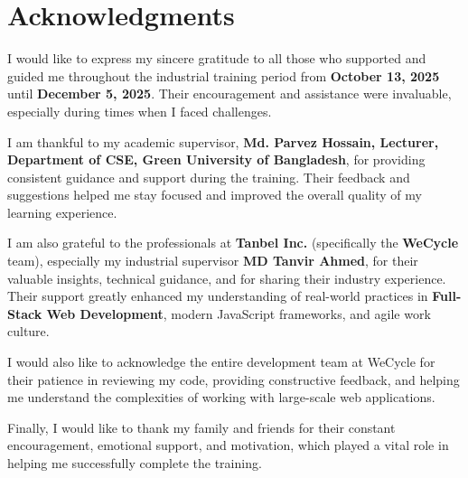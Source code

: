 \chapter*{\centering Acknowledgments}

I would like to express my sincere gratitude to all those who supported and guided me throughout the industrial training period from \textbf{October 13, 2025} until \textbf{December 5, 2025}. Their encouragement and assistance were invaluable, especially during times when I faced challenges.

I am thankful to my academic supervisor, \textbf{Md. Parvez Hossain, Lecturer, Department of CSE, Green University of Bangladesh}, for providing consistent guidance and support during the training. Their feedback and suggestions helped me stay focused and improved the overall quality of my learning experience.

I am also grateful to the professionals at \textbf{Tanbel Inc.} (specifically the \textbf{WeCycle} team), especially my industrial supervisor \textbf{MD Tanvir Ahmed}, for their valuable insights, technical guidance, and for sharing their industry experience. Their support greatly enhanced my understanding of real-world practices in \textbf{Full-Stack Web Development}, modern JavaScript frameworks, and agile work culture.

I would also like to acknowledge the entire development team at WeCycle for their patience in reviewing my code, providing constructive feedback, and helping me understand the complexities of working with large-scale web applications.

Finally, I would like to thank my family and friends for their constant encouragement, emotional support, and motivation, which played a vital role in helping me successfully complete the training.

\bigskip

